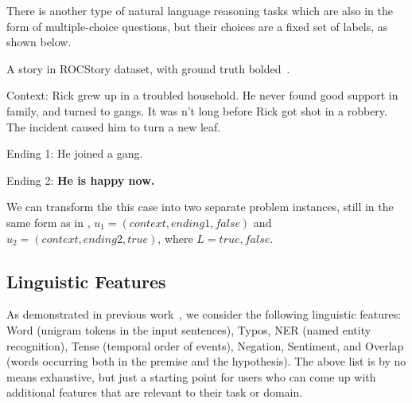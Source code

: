There is another type of natural language reasoning tasks which 
are also in the form of multiple-choice questions, 
but their choices are a fixed set of labels, as shown below. 
\begin{example}\label{exp:roc}
A story in ROCStory dataset, with ground truth bolded~\cite{mostafazadeh2016corpus}.
\begin{description}
\item{Context:} Rick grew up in a troubled household. 
He never found good support in family, and turned to gangs.           
It was n't long before Rick got shot in a robbery.             
The incident caused him to turn a new leaf.
\item{Ending 1:} He joined a gang. 
\item{Ending 2:}  \textbf{He is happy now.}
\end{description}
\end{example}

We can transform the this case into two separate 
problem instances, still
in the same form as in , 
$u_1=(context, ending1, false)$ and $u_2=(context, ending2, true)$, where $L = {true, false}$.

\subsection{Linguistic Features}
\label{sec:extract}

As demonstrated in previous work~\cite{naik2018stress,checklist2020acl}, 
we consider the following linguistic features: 
Word (unigram tokens in the input sentences), 
Typos, NER (named entity recognition), 
Tense (temporal order of events), Negation, 
Sentiment, and Overlap (words occurring both in the premise and 
the hypothesis). 
The above list is by no means exhaustive, but just a starting point for users 
who can come up with additional features that are relevant
to their task or domain. 

